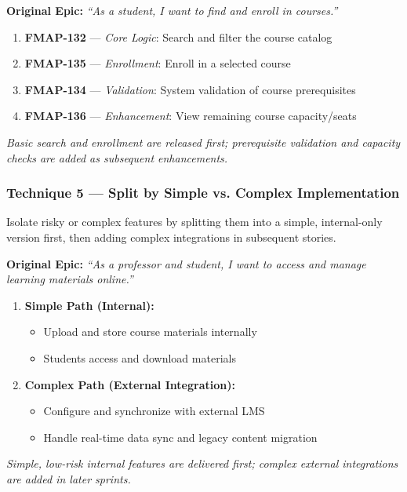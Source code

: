 \documentclass[12pt,a4paper]{article}
\begin{document}
\vspace{6pt}
\begin{tcolorbox}[storybox,title={\textbf{Example: Course Enrollment (Curriculum Module)}},fonttitle=\bfseries\color{agileblue}]
\textbf{Original Epic:} \textit{``As a student, I want to find and enroll in courses.''}
\vspace{4pt}
\begin{enumerate}[itemsep=2pt]
\item \textbf{FMAP-132} --- \textit{Core Logic}: Search and filter the course catalog
\item \textbf{FMAP-135} --- \textit{Enrollment}: Enroll in a selected course
\item \textbf{FMAP-134} --- \textit{Validation}: System validation of course prerequisites
\item \textbf{FMAP-136} --- \textit{Enhancement}: View remaining course capacity/seats
\end{enumerate}
\textit{Basic search and enrollment are released first; prerequisite validation and capacity checks are added as subsequent enhancements.}
\end{tcolorbox}

\vspace{10pt}
\subsubsection{Technique 5 --- Split by Simple vs. Complex Implementation}

Isolate risky or complex features by splitting them into a simple, internal-only version first, then adding complex integrations in subsequent stories.

\vspace{6pt}
\begin{tcolorbox}[storybox,title={\textbf{Example 5a: Content Delivery (Curriculum Module)}},fonttitle=\bfseries\color{agileblue}]
\textbf{Original Epic:} \textit{``As a professor and student, I want to access and manage learning materials online.''}
\vspace{4pt}
\begin{enumerate}[itemsep=2pt]
\item \textbf{Simple Path (Internal):}
  \begin{itemize}[itemsep=1pt]
    \item Upload and store course materials internally
    \item Students access and download materials
  \end{itemize}
\item \textbf{Complex Path (External Integration):}
  \begin{itemize}[itemsep=1pt]
    \item Configure and synchronize with external LMS
    \item Handle real-time data sync and legacy content migration
  \end{itemize}
\end{enumerate}
\textit{Simple, low-risk internal features are delivered first; complex external integrations are added in later sprints.}
\end{tcolorbox}
\end{document}
